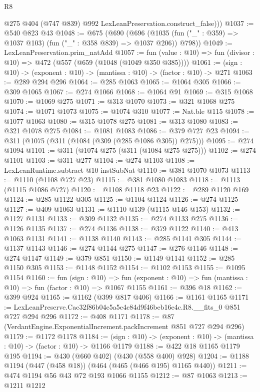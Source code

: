 \begin{lexlean}{R8}
\begin{coremodule}
          @275
          @404
          (@747 @839)
          @992
          LexLeanPreservation.construct_false)))
@1037 := @540 @823 @43
@1048 := @675
    (@690
      (@696 (@1035 (fun ("_" : @359) => @1037 @103) (fun ("_" : @358 @839) => @1037 @206)) @798))
@1049 := LexLeanPreservation.prim_natAdd
@1057 := fun (value : @10) => fun (divisor : @10) => @472 (@557 (@659 (@1048 (@1049 @350 @385))))
@1061 := (sign : @10) -> (exponent : @10) -> (mantissa : @10) -> (factor : @10) -> @271
@1063 := @289 @294 @296
@1064 := @285 @1063
@1065 := @1064 @305
@1066 := @309 @1065
@1067 := @274 @1066
@1068 := @1064 @91
@1069 := @315 @1068
@1070 := @1069 @275
@1071 := @313 @1070
@1073 := @321 @1068 @275
@1074 := @1071 @1073
@1075 := @1074 @310
@1077 := Nat.ble @115
@1078 := @1077 @1063
@1080 := @315 @1078 @275
@1081 := @313 @1080
@1083 := @321 @1078 @275
@1084 := @1081 @1083
@1086 := @379 @727 @23
@1094 := @311 (@1075 (@311 (@1084 (@309 (@285 @1086 @305)) @275)))
@1095 := @274 @1094
@1101 := @311 (@1074 @275 (@311 (@1084 @275 @275)))
@1102 := @274 @1101
@1103 := @311 @277
@1104 := @274 @1103
@1108 := LexLeanRuntime.subtract @10 instSubNat
@1110 := @381 @1070 @1073
@1113 := @1110 (@1108 @727 @23)
@1115 := @381 @1080 @1083
@1118 := @1113 (@1115 @1086 @727)
@1120 := @1108 @1118 @23
@1122 := @289 @1120 @169
@1124 := @285 @1122 @305
@1125 := @1104 @1124
@1126 := @274 @1125
@1127 := @409 @1063
@1131 := @1110 @139 (@1115 @146 @153)
@1132 := @1127 @1131
@1133 := @309 @1132
@1135 := @274 @1133 @275
@1136 := @1126 @1135
@1137 := @274 @1136
@1138 := @379 @1122
@1140 := @413 @1063 @1131
@1141 := @1138 @1140
@1143 := @285 @1141 @305
@1144 := @1137 @1143
@1146 := @274 @1144 @275
@1147 := @276 @1146
@1148 := @274 @1147
@1149 := @379 @851
@1150 := @1149 @1141
@1152 := @285 @1150 @305
@1153 := @1148 @1152
@1154 := @1102 @1153
@1155 := @1095 @1154
@1160 := fun (sign : @10) =>
  fun (exponent : @10) => fun (mantissa : @10) => fun (factor : @10) => @1067 @1155
@1161 := @396 @18
@1162 := @399 @924
@1165 := @1162 (@399 @817 @406)
@1166 := @1161 @1165
@1171 := LexLeanPreserve.Cac32f86b04c5a5e4c84d9f46beb16e4c.R8.__fits_0 @851 @727 @294 @296
@1172 := @408 @1171
@1178 := @87 (VerdantEngine.ExponentialIncrement.packIncrement @851 @727 @294 @296)
@1179 := @1172 @1178
@1184 := (sign : @10) -> (exponent : @10) -> (mantissa : @10) -> (factor : @10) -> @1166 @1179
@1188 := @422 @18 @1165 @1179 @195
@1194 := @430 (@660 @402) (@430 (@558 @400) @928)
@1204 := @1188 @1194 (@447 (@458 @18)) (@464 (@465 (@466 @195) @1165 @440))
@1211 := @474 @1194 @56 @43 @72 @193 @1066 @1155
@1212 := @87 @1063
@1213 := @1211 @1212

\end{coremodule}
\end{lexlean}
